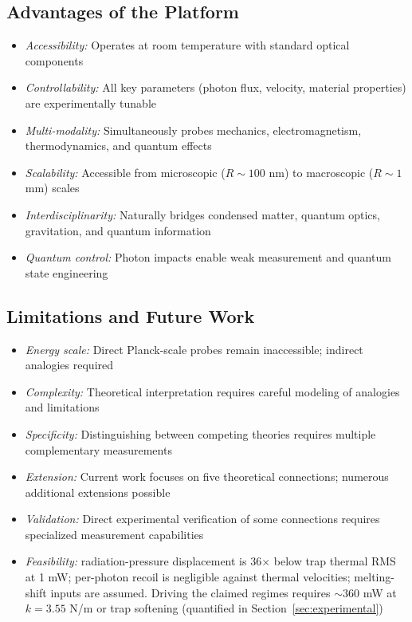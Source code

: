 \documentclass[12pt,twoside]{article}
\begin{document}
\subsection{Advantages of the Platform}
\begin{itemize}
\item \textit{Accessibility:} Operates at room temperature with standard optical components
\item \textit{Controllability:} All key parameters (photon flux, velocity, material properties) are experimentally tunable
\item \textit{Multi-modality:} Simultaneously probes mechanics, electromagnetism, thermodynamics, and quantum effects
\item \textit{Scalability:} Accessible from microscopic ($R \sim 100$ nm) to macroscopic ($R \sim 1$ mm) scales
\item \textit{Interdisciplinarity:} Naturally bridges condensed matter, quantum optics, gravitation, and quantum information
\item \textit{Quantum control:} Photon impacts enable weak measurement and quantum state engineering
\end{itemize}

\subsection{Limitations and Future Work}
\begin{itemize}
\item \textit{Energy scale:} Direct Planck-scale probes remain inaccessible; indirect analogies required
\item \textit{Complexity:} Theoretical interpretation requires careful modeling of analogies and limitations
\item \textit{Specificity:} Distinguishing between competing theories requires multiple complementary measurements
\item \textit{Extension:} Current work focuses on five theoretical connections; numerous additional extensions possible
\item \textit{Validation:} Direct experimental verification of some connections requires specialized measurement capabilities
\item \textit{Feasibility:} radiation-pressure displacement is 36$\times$ below trap thermal RMS at 1 mW; per-photon recoil is negligible against thermal velocities; melting-shift inputs are assumed. Driving the claimed regimes requires $\sim$360 mW at $k=3.55$ N/m or trap softening (quantified in Section~\ref{sec:experimental})
\end{itemize}
\end{document}
